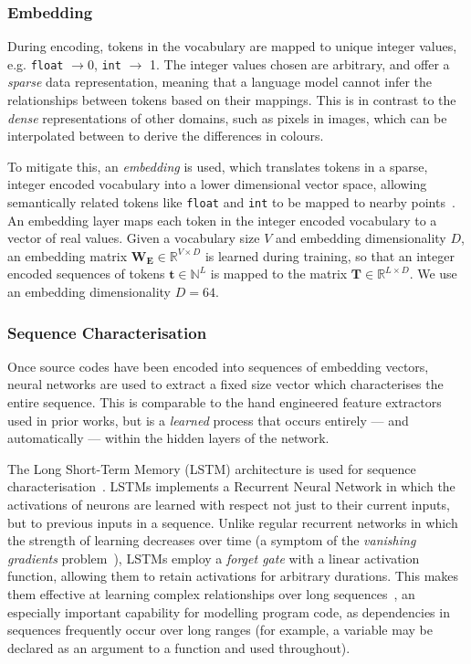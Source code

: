 

\subsubsection{Embedding}

During encoding, tokens in the vocabulary are mapped to unique integer values, e.g. \texttt{float} $\rightarrow 0$, \texttt{int} $\rightarrow$ 1. The integer values chosen are arbitrary, and offer a \emph{sparse} data representation, meaning that a language model cannot infer the relationships between tokens based on their mappings. This is in contrast to the \emph{dense} representations of other domains, such as pixels in images, which can be interpolated between to derive the differences in colours.

To mitigate this, an \emph{embedding} is used, which translates tokens in a sparse, integer encoded vocabulary into a lower dimensional vector space, allowing semantically related tokens like \texttt{float} and \texttt{int} to be mapped to nearby points~\cite{Mikolov2013a,Baroni2014}. An embedding layer maps each token in the integer encoded vocabulary to a vector of real values. Given a vocabulary size $V$ and embedding dimensionality $D$, an embedding matrix $\bm{W_{E}} \in \mathbb{R}^{V \times D}$ is learned during training, so that an integer encoded sequences of tokens $\bm{t} \in \mathbb{N}^{L}$ is mapped to the matrix $\bm{T} \in \mathbb{R}^{L \times D}$. We use an embedding dimensionality $D = 64$.

\subsubsection{Sequence Characterisation}

Once source codes have been encoded into sequences of embedding vectors, neural networks are used to extract a fixed size vector which characterises the entire sequence. This is comparable to the hand engineered feature extractors used in prior works, but is a \emph{learned} process that occurs entirely --- and automatically --- within the hidden layers of the network.

The Long Short-Term Memory (LSTM) architecture is used for sequence characterisation~\cite{Hochreiter1997}. LSTMs implements a Recurrent Neural Network in which the activations of neurons are learned with respect not just to their current inputs, but to previous inputs in a sequence. Unlike regular recurrent networks in which the strength of learning decreases over time (a symptom of the \emph{vanishing gradients} problem~\cite{Pacanu2013}), LSTMs employ a \emph{forget gate} with a linear activation function, allowing them to retain activations for arbitrary durations. This makes them effective at learning complex relationships over long sequences~\cite{Lipton2015}, an especially important capability for modelling program code, as dependencies in sequences frequently occur over long ranges (for example, a variable may be declared as an argument to a function and used throughout).

